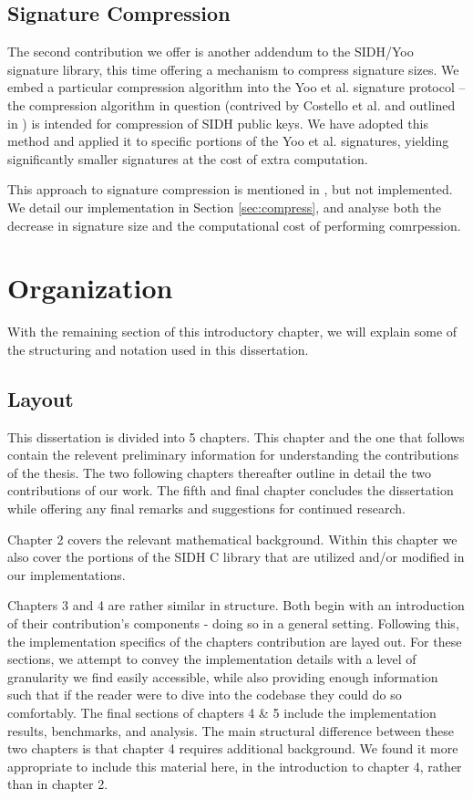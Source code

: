 \subsection{Signature Compression}

The second contribution we offer is another addendum to the SIDH/Yoo signature library, this time offering a mechanism to  compress signature sizes.  We embed a particular compression algorithm into the Yoo et al. signature protocol -- the compression algorithm in question (contrived by Costello et al. and outlined in \cite{pkcomp}) is intended for compression of SIDH public keys. We have adopted this method and applied it to specific portions of the Yoo et al. signatures, yielding significantly smaller signatures at the cost of extra computation.

This approach to signature compression is mentioned in \cite{yoo}, but not implemented. We detail our implementation in Section \ref{sec:compress}, and analyse both the decrease in signature size and the computational cost of performing comrpession. 

\section{Organization}

With the remaining section of this introductory chapter, we will explain some of the structuring and notation used in this dissertation.

\subsection{Layout}

This dissertation is divided into 5 chapters. This chapter and the one that follows contain the relevent preliminary information for understanding the contributions of the thesis. The two following chapters thereafter outline in detail the two contributions of our work. The fifth and final chapter concludes the dissertation while offering any final remarks and suggestions for continued research.

Chapter 2 covers the relevant mathematical background. Within this chapter we also cover the portions of the SIDH C library that are utilized and/or modified in our implementations.

Chapters 3 and 4 are rather similar in structure. Both begin with an introduction of their contribution's components - doing so in a general setting. Following this, the implementation specifics of the chapters contribution are layed out. For these sections, we attempt to convey the implementation details with a level of granularity we find easily accessible, while also providing enough information such that if the reader were to dive into the codebase they could do so comfortably. The final sections of chapters 4 \& 5 include the implementation results, benchmarks, and analysis. The main structural difference between these two chapters is that chapter 4 requires additional background. We found it more appropriate to include this material here, in the introduction to chapter 4, rather than in chapter 2.

